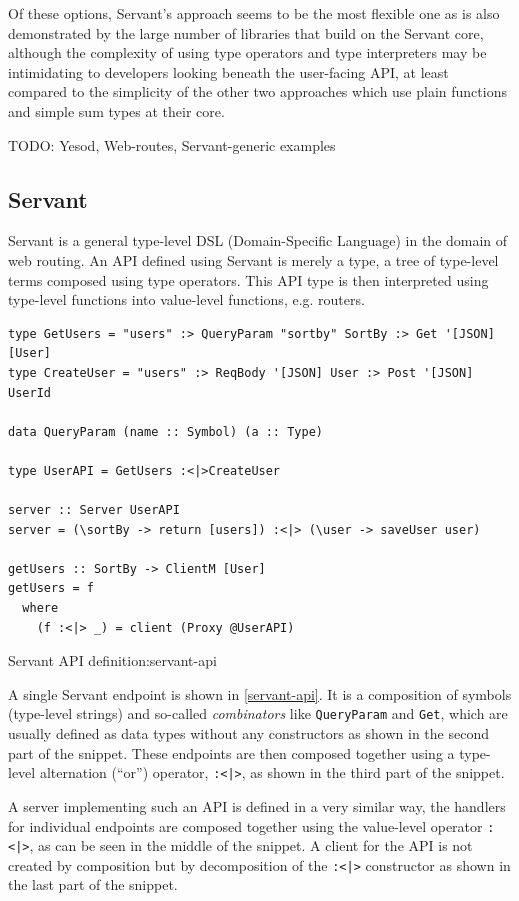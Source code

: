 \documentclass[english,odsaz]{fitthesis}
\begin{document}
Of these options, Servant's approach seems to be the most flexible one as is
also demonstrated by the large number of libraries that build on the Servant
core, although the complexity of using type operators and type interpreters may
be intimidating to developers looking beneath the user-facing API, at least
compared to the simplicity of the other two approaches which use plain functions
and simple sum types at their core.

TODO: Yesod, Web-routes, Servant-generic examples

\subsection{Servant}
\label{sec:org6be5c5b}
Servant is a general type-level DSL (Domain-Specific Language) in the domain of
web routing. An API defined using Servant is merely a type, a tree of type-level
terms composed using type operators. This API type is then interpreted using
type-level functions into value-level functions, e.g. routers.

\begin{listing}[htbp]
\begin{verbatim}
type GetUsers = "users" :> QueryParam "sortby" SortBy :> Get '[JSON] [User]
type CreateUser = "users" :> ReqBody '[JSON] User :> Post '[JSON] UserId

data QueryParam (name :: Symbol) (a :: Type)

type UserAPI = GetUsers :<|>CreateUser

server :: Server UserAPI
server = (\sortBy -> return [users]) :<|> (\user -> saveUser user)

getUsers :: SortBy -> ClientM [User]
getUsers = f
  where
    (f :<|> _) = client (Proxy @UserAPI)
\end{verbatim}
\caption{Servant API definition:servant-api}
\end{listing}

A single Servant endpoint is shown in \ref{servant-api}. It is a composition of
symbols (type-level strings) and so-called \emph{combinators} like \texttt{QueryParam} and \texttt{Get},
which are usually defined as data types without any constructors as shown in the
second part of the snippet. These endpoints are then composed together using a
type-level alternation (``or'') operator, \texttt{:<|>}, as shown in the third part of the
snippet.

A server implementing such an API is defined in a very similar way, the handlers
for individual endpoints are composed together using the value-level operator
\texttt{:<|>}, as can be seen in the middle of the snippet. A client for the API is not
created by composition but by decomposition of the \texttt{:<|>} constructor as shown in
the last part of the snippet.
\end{document}
